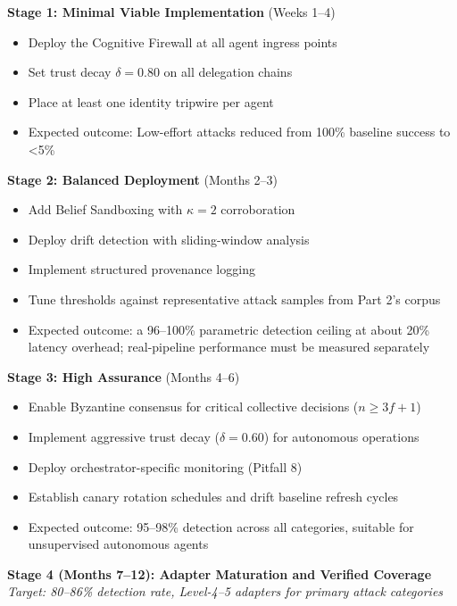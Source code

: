 \documentclass[
]{article}
\providecommand{\tightlist}{%
  \setlength{\itemsep}{0pt}\setlength{\parskip}{0pt}}
\begin{document}
\textbf{Stage 1: Minimal Viable Implementation} (Weeks 1--4)

\begin{itemize}
\tightlist
\item
  Deploy the Cognitive Firewall at all agent ingress points
\item
  Set trust decay \(\delta = 0.80\) on all delegation chains
\item
  Place at least one identity tripwire per agent
\item
  Expected outcome: Low-effort attacks reduced from 100\% baseline
  success to \textless5\%
\end{itemize}

\textbf{Stage 2: Balanced Deployment} (Months 2--3)

\begin{itemize}
\tightlist
\item
  Add Belief Sandboxing with \(\kappa = 2\) corroboration
\item
  Deploy drift detection with sliding-window analysis
\item
  Implement structured provenance logging
\item
  Tune thresholds against representative attack samples from Part 2's
  corpus
\item
  Expected outcome: a 96--100\% parametric detection ceiling at
  about 20\% latency overhead; real-pipeline performance must
  be measured separately
\end{itemize}

\textbf{Stage 3: High Assurance} (Months 4--6)

\begin{itemize}
\tightlist
\item
  Enable Byzantine consensus for critical collective decisions
  (\(n \geq 3f + 1\))
\item
  Implement aggressive trust decay (\(\delta = 0.60\)) for autonomous
  operations
\item
  Deploy orchestrator-specific monitoring (Pitfall 8)
\item
  Establish canary rotation schedules and drift baseline refresh cycles
\item
  Expected outcome: 95--98\% detection across all categories, suitable
  for unsupervised autonomous agents
\end{itemize}

\textbf{Stage 4 (Months 7--12): Adapter Maturation and Verified
Coverage} \emph{Target: 80--86\% detection rate, Level-4--5 adapters for
primary attack categories}
\end{document}
